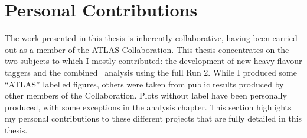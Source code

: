\chapter*{\color{oxfordblue} Personal Contributions}

The work presented in this thesis is inherently collaborative, having been carried out as a member of the ATLAS Collaboration. This thesis concentrates on the two subjects to which I mostly contributed: the development of new heavy flavour taggers and the combined \vhbc\ analysis using the full Run 2. While I produced some ``ATLAS'' labelled figures, others were taken from public results produced by other members of the Collaboration. Plots without label have been personally produced, with some exceptions in the analysis chapter. This section highlights my personal contributions to these different projects that are fully detailed in this thesis.


